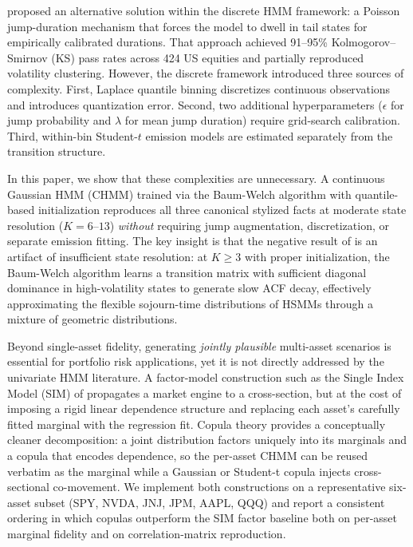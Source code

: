 \citet{alswaidan2026hybrid} proposed an alternative solution within the discrete HMM framework: a Poisson jump-duration mechanism that forces the model to dwell in tail states for empirically calibrated durations.
That approach achieved 91--95\% Kolmogorov--Smirnov (KS) pass rates across 424 US equities and partially reproduced volatility clustering.
However, the discrete framework introduced three sources of complexity.
First, Laplace quantile binning discretizes continuous observations and introduces quantization error.
Second, two additional hyperparameters ($\epsilon$ for jump probability and $\lambda$ for mean jump duration) require grid-search calibration.
Third, within-bin Student-$t$ emission models are estimated separately from the transition structure.

In this paper, we show that these complexities are unnecessary.
A continuous Gaussian HMM (CHMM) trained via the Baum-Welch algorithm \cite{baum1970maximization, rabiner1986introduction} with quantile-based initialization reproduces all three canonical stylized facts at moderate state resolution ($K = 6$--$13$) \emph{without} requiring jump augmentation, discretization, or separate emission fitting.
The key insight is that the negative result of \citet{ryden1998stylized} is an artifact of insufficient state resolution: at $K \geq 3$ with proper initialization, the Baum-Welch algorithm learns a transition matrix with sufficient diagonal dominance in high-volatility states to generate slow ACF decay, effectively approximating the flexible sojourn-time distributions of HSMMs through a mixture of geometric distributions.

Beyond single-asset fidelity, generating \emph{jointly plausible} multi-asset scenarios is essential for portfolio risk applications, yet it is not directly addressed by the univariate HMM literature.
A factor-model construction such as the Single Index Model (SIM) of \citet{sharpe1963simplified} propagates a market engine to a cross-section, but at the cost of imposing a rigid linear dependence structure and replacing each asset's carefully fitted marginal with the regression fit.
Copula theory \cite{sklar1959fonctions, nelsen2006introduction} provides a conceptually cleaner decomposition: a joint distribution factors uniquely into its marginals and a copula that encodes dependence, so the per-asset CHMM can be reused verbatim as the marginal while a Gaussian or Student-t copula \cite{demarta2005tcopula, mcneil2015quantitative} injects cross-sectional co-movement. We implement both constructions on a representative six-asset subset (SPY, NVDA, JNJ, JPM, AAPL, QQQ) and report a consistent ordering in which copulas outperform the SIM factor baseline both on per-asset marginal fidelity and on correlation-matrix reproduction.

